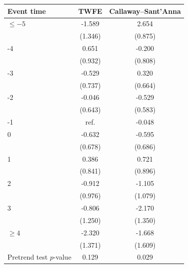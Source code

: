 \begin{tabular}{lcc}
\toprule
Event time & TWFE & Callaway--Sant'Anna \\
\midrule
\(\le -5\) & -1.589 &  2.654 \\
 & (1.346) & (0.875) \\
-4 &  0.651 & -0.200 \\
 & (0.932) & (0.808) \\
-3 & -0.529 &  0.320 \\
 & (0.737) & (0.664) \\
-2 & -0.046 & -0.529 \\
 & (0.643) & (0.583) \\
-1 & \multicolumn{1}{c}{ref.} & -0.048 \\
0 & -0.632 & -0.595 \\
 & (0.678) & (0.686) \\
1 &  0.386 &  0.721 \\
 & (0.841) & (0.896) \\
2 & -0.912 & -1.105 \\
 & (0.976) & (1.079) \\
3 & -0.806 & -2.170 \\
 & (1.250) & (1.350) \\
\(\ge 4\) & -2.320 & -1.668 \\
 & (1.371) & (1.609) \\
\midrule
Pretrend test \(p\)-value & 0.129 & 0.029 \\
\bottomrule
\end{tabular}

